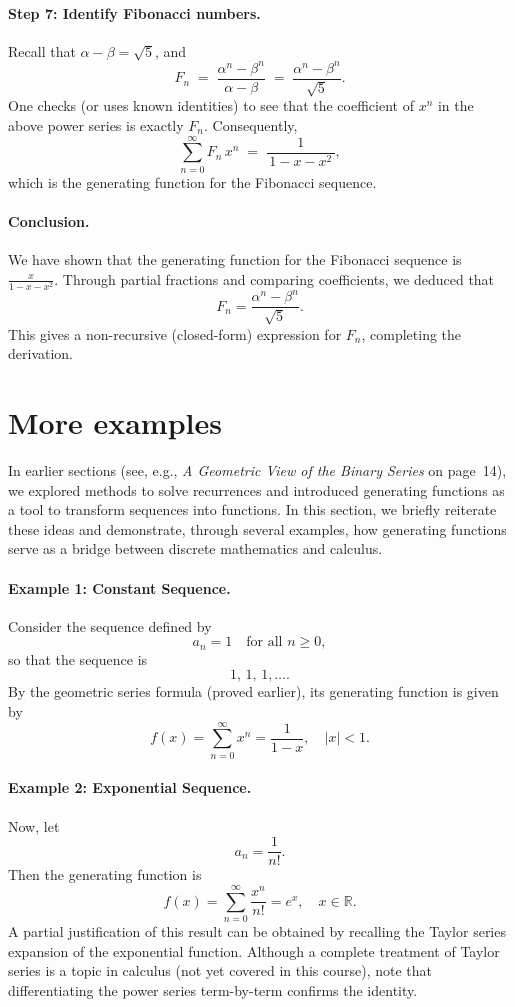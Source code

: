 \documentclass{article}
\begin{document}
\paragraph{Step 7: Identify Fibonacci numbers.}

Recall that \(\alpha - \beta = \sqrt{5}\), and
\[
F_n
\;=\;
\frac{\alpha^n - \beta^n}{\,\alpha - \beta\,}
\;=\;
\frac{\alpha^n - \beta^n}{\,\sqrt{5}\,}.
\]
One checks (or uses known identities) to see that the coefficient of \(x^n\) in the above power series is exactly \(F_n\).  Consequently,
\[
\sum_{n=0}^\infty F_n \, x^n
\;=\;
\frac{1}{\,1 - x - x^2\,},
\]
which is the generating function for the Fibonacci sequence.

\paragraph{Conclusion.}
We have shown that the generating function for the Fibonacci sequence is 
\(\tfrac{x}{1 - x - x^2}\).  
Through partial fractions and comparing coefficients, we deduced that
\[
F_n = \frac{\alpha^n - \beta^n}{\sqrt{5}}.
\]
This gives a non-recursive (closed-form) expression for \(F_n\), completing the derivation.

\section{More examples}

In earlier sections (see, e.g., \emph{A Geometric View of the Binary Series} on page~14), we explored methods to solve recurrences and introduced generating functions as a tool to transform sequences into functions. In this section, we briefly reiterate these ideas and demonstrate, through several examples, how generating functions serve as a bridge between discrete mathematics and calculus.

\paragraph{Example 1: Constant Sequence.}  
Consider the sequence defined by
\[
a_n=1 \quad \text{for all } n\ge0,
\]
so that the sequence is
\[
1,\,1,\,1,\dots.
\]
By the geometric series formula (proved earlier), its generating function is given by
\[
f(x)=\sum_{n=0}^{\infty} x^n=\frac{1}{1-x}, \quad |x|<1.
\]

\paragraph{Example 2: Exponential Sequence.}  
Now, let
\[
a_n=\frac{1}{n!}.
\]
Then the generating function is
\[
f(x)=\sum_{n=0}^{\infty} \frac{x^n}{n!}=e^x, \quad x\in\mathbb{R}.
\]
A partial justification of this result can be obtained by recalling the Taylor series expansion of the exponential function. Although a complete treatment of Taylor series is a topic in calculus (not yet covered in this course), note that differentiating the power series term-by-term confirms the identity.
\end{document}
